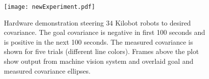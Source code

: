 \begin{figure}[!htb]
\begin{center}
\vspace{-1em}
	\texttt{[image: newExperiment.pdf]}
\end{center}
\vspace{-2em}
\caption{\label{fig:covExperiment}
Hardware demonstration steering $34$ Kilobot robots to desired covariance. The goal covariance is negative in first 100 seconds and is positive in the next 100 seconds. The measured covariance is shown for five trials (different line colors). Frames above the plot show output from machine vision system and overlaid goal and measured covariance ellipses.
\vspace{-1.5 em}
}
\end{figure}

